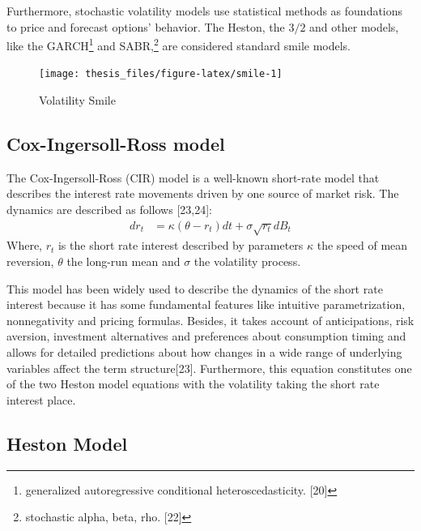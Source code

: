 \documentclass[12pt,oneside]{reedthesis}
\theoremstyle{definition}
\theoremstyle{definition}
\theoremstyle{remark}
\begin{document}
  
  Furthermore, stochastic volatility models use statistical methods as
  foundations to price and forecast options' behavior. The Heston, the
  \(3/2\) and other models, like the GARCH\footnote{generalized
    autoregressive conditional heteroscedasticity. {[}20{]}} and
  SABR,\footnote{stochastic alpha, beta, rho. {[}22{]}} are considered
  standard smile models.
  \begin{figure}
  
  {\centering \texttt{[image: thesis\_files/figure-latex/smile-1]} 
  
  }
  
  \caption{Volatility Smile \label{smile}}\label{fig:smile}
  \end{figure}
  \subsection{Cox-Ingersoll-Ross model}\label{cir}
  
  The Cox-Ingersoll-Ross (CIR) model is a well-known short-rate model that
  describes the interest rate movements driven by one source of market
  risk. The dynamics are described as follows {[}23,24{]}:
  \begin{align}
  \label{eq:cir}
  dr_t &= \kappa (\theta - r_t)dt + \sigma \sqrt{r_t} dB_t
  \end{align}
  \noindent
  Where, \(r_t\) is the short rate interest described by parameters
  \(\kappa\) the speed of mean reversion, \(\theta\) the long-run mean and
  \(\sigma\) the volatility process.
  
  This model has been widely used to describe the dynamics of the short
  rate interest because it has some fundamental features like intuitive
  parametrization, nonnegativity and pricing formulas. Besides, it takes
  account of anticipations, risk aversion, investment alternatives and
  preferences about consumption timing and allows for detailed predictions
  about how changes in a wide range of underlying variables affect the
  term structure{[}23{]}. Furthermore, this equation constitutes one of
  the two Heston model equations with the volatility taking the short rate
  interest place.
  
  \subsection{Heston Model}\label{hes1}
  
\end{document}
